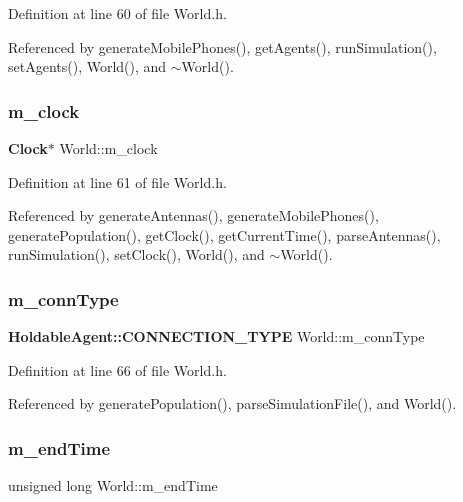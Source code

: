 Definition at line 60 of file World.\+h.



Referenced by generate\+Mobile\+Phones(), get\+Agents(), run\+Simulation(), set\+Agents(), World(), and $\sim$\+World().

\mbox{\label{class_world_a8359eb424f01e41703faa0885a4414bf}} 
\subsubsection{m\+\_\+clock}
{\footnotesize\ttfamily \textbf{ Clock}$\ast$ World\+::m\+\_\+clock\hspace{0.3cm}{\ttfamily [private]}}



Definition at line 61 of file World.\+h.



Referenced by generate\+Antennas(), generate\+Mobile\+Phones(), generate\+Population(), get\+Clock(), get\+Current\+Time(), parse\+Antennas(), run\+Simulation(), set\+Clock(), World(), and $\sim$\+World().

\mbox{\label{class_world_afeac65cddcd1e1c4fa14a17efa35be06}} 
\subsubsection{m\+\_\+conn\+Type}
{\footnotesize\ttfamily \textbf{ Holdable\+Agent\+::\+C\+O\+N\+N\+E\+C\+T\+I\+O\+N\+\_\+\+T\+Y\+PE} World\+::m\+\_\+conn\+Type\hspace{0.3cm}{\ttfamily [private]}}



Definition at line 66 of file World.\+h.



Referenced by generate\+Population(), parse\+Simulation\+File(), and World().

\mbox{\label{class_world_ab6b8ad11e4031f3072a78f00a66e9ec5}} 
\subsubsection{m\+\_\+end\+Time}
{\footnotesize\ttfamily unsigned long World\+::m\+\_\+end\+Time\hspace{0.3cm}{\ttfamily [private]}}



